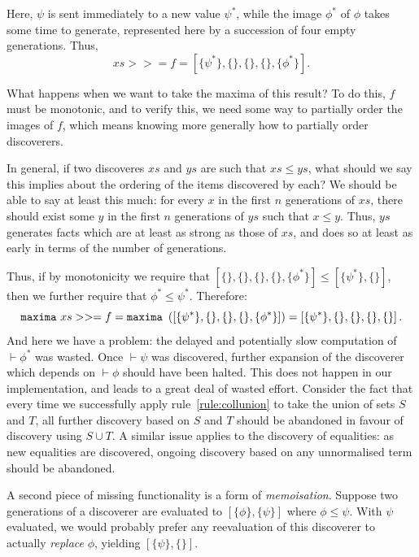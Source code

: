 Here, $\psi$ is sent immediately to a new value $\psi^{*}$, while the image $\phi^{*}$ of $\phi$ takes some time to generate, represented here by a succession of four empty generations. Thus,
\begin{displaymath}
xs >>= f = \left[\{\psi^{*}\}, \{\}, \{\}, \{\}, \{\phi^{*}\}\right].
\end{displaymath}

What happens when we want to take the maxima of this result? To do this, $f$ must be monotonic, and to verify this, we need some way to partially order the images of $f$, which means knowing more generally how to partially order discoverers.

In general, if two discoveres $xs$ and $ys$ are such that $xs \leq ys$, what should we say this implies about the ordering of the items discovered by each? We should be able to say at least this much: for every $x$ in the first $n$ generations of $xs$, there should exist some $y$ in the first $n$ generations of $ys$ such that $x \leq y$. Thus, $ys$ generates facts which are at least as strong as those of $xs$, and does so at least as early in terms of the number of generations.

Thus, if by monotonicity we require that $\left[\{\},\{\},\{\},\{\},\{\phi^{*}\}\right] \leq \left[\{\psi^{*}\},\{\}\right]$, then we further require that $\phi^{*} \leq \psi^{*}$. Therefore:
\begin{displaymath}
\texttt{maxima}\ xs >>= f = \texttt{maxima}\ \left(\left[\{\psi^{*}\}, \{\}, \{\}, \{\}, \{\phi^{*}\}\right]\right) = \left[\{\psi^{*}\}, \{\}, \{\}, \{\}, \{\}\right].
\end{displaymath}
And here we have a problem: the delayed and potentially slow computation of $\vdash \phi^{*}$ was wasted. Once $\vdash \psi$ was discovered, further expansion of the discoverer which depends on $\vdash \phi$ should have been halted. This does not happen in our implementation, and leads to a great deal of wasted effort. Consider the fact that every time we successfully apply rule~\ref{rule:collunion} to take the union of sets $S$ and $T$, all further discovery based on $S$ and $T$ should be abandoned in favour of discovery using $S \cup T$. A similar issue applies to the discovery of equalities: as new equalities are discovered, ongoing discovery based on any unnormalised term should be abandoned.

A second piece of missing functionality is a form of \emph{memoisation}. Suppose two generations of a discoverer are evaluated to $[\{\phi\}, \{\psi\}]$ where $\phi \leq \psi$. With $\psi$ evaluated, we would probably prefer any reevaluation of this discoverer to actually \emph{replace} $\phi$, yielding $[\{\psi\}, \{\}]$. 

